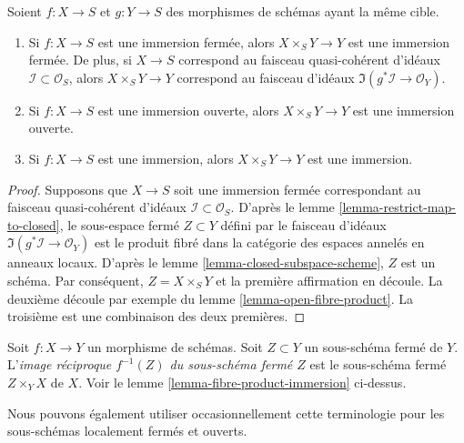\begin{lemma}
\label{lemma-fibre-product-immersion}
Soient $f : X \to S$ et $g : Y \to S$ des morphismes de schémas
ayant la même cible.
\begin{enumerate}
\item Si $f : X \to S$ est une immersion fermée,
alors $X \times_S Y \to Y$ est une immersion fermée.
De plus, si $X \to S$ correspond au faisceau quasi-cohérent
d'idéaux $\mathcal{I} \subset \mathcal{O}_S$, alors $X
\times_S Y \to Y$ correspond au faisceau d'idéaux
$\Im(g^*\mathcal{I} \to \mathcal{O}_Y)$. \item Si $f
: X \to S$ est une immersion ouverte, alors
$X \times_S Y \to Y$ est une immersion ouverte.
\item Si $f : X \to S$ est une immersion,
alors $X \times_S Y \to Y$ est une immersion.
\end{enumerate}
\end{lemma}

\begin{proof}
Supposons que $X \to S$ soit une immersion fermée correspondant
au faisceau quasi-cohérent d'idéaux $\mathcal{I} \subset \mathcal{O}_S$. D'après le
lemme \ref{lemma-restrict-map-to-closed}, le sous-espace fermé $Z \subset
Y$ défini par le faisceau d'idéaux $\Im(g^*\mathcal{I}
\to \mathcal{O}_Y)$ est le produit fibré dans la catégorie
des espaces annelés en anneaux locaux. D'après
le lemme \ref{lemma-closed-subspace-scheme}, $Z$ est un schéma. Par
conséquent, $Z = X \times_S Y$ et la première affirmation en
découle. La deuxième découle par exemple du lemme \ref{lemma-open-fibre-product}.
La troisième est une combinaison des
deux premières.
\end{proof}

\begin{definition}
\label{definition-inverse-image-closed-subscheme}
Soit $f : X \to Y$ un morphisme de schémas. Soit $Z \subset Y$ un
sous-schéma fermé de $Y$. L'{\it image réciproque $f^{-1}(Z)$ du sous-schéma
fermé $Z$} est le sous-schéma fermé $Z \times_Y X$ de $X$.
Voir le lemme \ref{lemma-fibre-product-immersion} ci-dessus.
\end{definition}

\noindent
Nous pouvons également utiliser occasionnellement cette terminologie pour les sous-schémas localement
fermés et ouverts.









